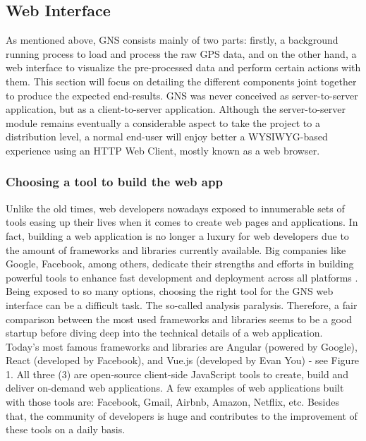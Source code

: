 
\subsection{Web Interface}
As mentioned above, GNS consists mainly of two parts: firstly, a background running process to load and process the raw GPS data, and on the other hand, a web interface to visualize the pre-processed data and perform certain actions with them. This section will focus on detailing the different components joint together to produce the expected end-results.
GNS was never conceived as server-to-server application, but as a client-to-server application. Although the server-to-server module remains eventually a considerable aspect to take the project to a distribution level, a normal end-user will enjoy better a WYSIWYG-based experience using an HTTP Web Client, mostly known as a web browser.

\vspace{1.0cm}
\noindent
\subsubsection{Choosing a tool to build the web app}

Unlike the old times, web developers nowadays exposed to innumerable sets of tools easing up their lives when it comes to create web pages and applications. In fact, building a web application is no longer a luxury for web developers due to the amount of frameworks and libraries currently available. Big companies like Google, Facebook, among others, dedicate their strengths and efforts in building powerful tools to enhance fast development and deployment across all platforms \cite{angular}.\\

Being exposed to so many options, choosing the right tool for the GNS web interface can be a difficult task. The so-called analysis paralysis. Therefore, a fair comparison between the most used frameworks and libraries seems to be a good startup before diving deep into the technical details of a web application. \\

Today’s most famous frameworks and libraries are Angular (powered by Google), React (developed by Facebook), and Vue.js (developed by Evan You) - see Figure 1. All three (3) are open-source client-side JavaScript tools to create, build and deliver on-demand web applications. A few examples of web applications built with those tools are: Facebook, Gmail, Airbnb, Amazon, Netflix, etc. Besides that, the community of developers is huge and contributes to the improvement of these tools on a daily basis.\\

